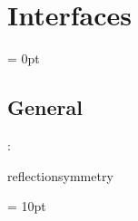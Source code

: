 
\section{Interfaces} 


\parskip = 0pt

\vspace{3mm} \subsection*{General}

: 

reflectionsymmetry
\vspace{2mm}

\vspace{5mm}\parskip = 10pt 
